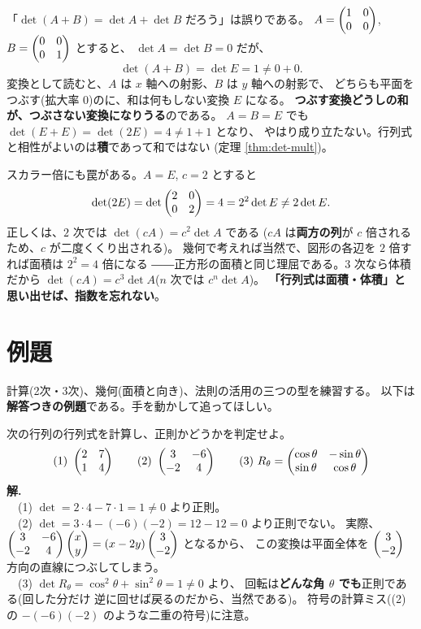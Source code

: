 \begin{hanrei}[行列式は和を保たない]\label{hanrei:detsum}
「$\det(A + B) = \det A + \det B$ だろう」は誤りである。
$A = \begin{pmatrix}1 & 0 \\ 0 & 0\end{pmatrix}$, $B = \begin{pmatrix}0 & 0 \\ 0 & 1\end{pmatrix}$ とすると、
$\det A = \det B = 0$ だが、
\[
\det(A + B) = \det E = 1 \neq 0 + 0.
\]
変換として読むと、$A$ は $x$ 軸への射影、$B$ は $y$ 軸への射影で、
どちらも平面をつぶす(拡大率 $0$)のに、和は何もしない変換 $E$ になる。
\textbf{つぶす変換どうしの和が、つぶさない変換になりうる}のである。
$A = B = E$ でも $\det(E + E) = \det(2E) = 4 \neq 1 + 1$ となり、
やはり成り立たない。行列式と相性がよいのは\textbf{積}であって和ではない
(定理 \ref{thm:det-mult})。
\end{hanrei}

\begin{hanrei}[$\det(cA) = c \det A$ は誤り]\label{hanrei:detscalar}
スカラー倍にも罠がある。$A = E$, $c = 2$ とすると
\[
\det(2E) = \det \begin{pmatrix}2 & 0 \\ 0 & 2\end{pmatrix} = 4 = 2^2 \det E \neq 2 \det E.
\]
正しくは、$2$ 次では $\det(cA) = c^2 \det A$ である
($cA$ は\textbf{両方の列}が $c$ 倍されるため、$c$ が二度くくり出される)。
幾何で考えれば当然で、図形の各辺を $2$ 倍すれば面積は $2^2 = 4$ 倍になる
――正方形の面積と同じ理屈である。$3$ 次なら体積だから
$\det(cA) = c^3 \det A$($n$ 次では $c^n \det A$)。
\textbf{「行列式は面積・体積」と思い出せば、指数を忘れない}。
\end{hanrei}

\section{例題}

計算(2次・3次)、幾何(面積と向き)、法則の活用の三つの型を練習する。
以下は\textbf{解答つきの例題}である。手を動かして追ってほしい。

\begin{rei}[例題・基本($2$ 次の計算と判定)]\label{rei:det-basic2}
次の行列の行列式を計算し、正則かどうかを判定せよ。
\[
(1)\ \begin{pmatrix}2 & 7 \\ 1 & 4\end{pmatrix} \qquad
(2)\ \begin{pmatrix}3 & -6 \\ -2 & 4\end{pmatrix} \qquad
(3)\ R_\theta = \begin{pmatrix}\cos\theta & -\sin\theta \\ \sin\theta & \cos\theta\end{pmatrix}
\]
\textbf{解.}\\
　(1) $\det = 2 \cdot 4 - 7 \cdot 1 = 1 \neq 0$ より正則。\\
　(2) $\det = 3 \cdot 4 - (-6)(-2) = 12 - 12 = 0$ より正則でない。
実際、$\begin{pmatrix}3 & -6 \\ -2 & 4\end{pmatrix}\begin{pmatrix}x \\ y\end{pmatrix} = (x - 2y)\begin{pmatrix}3 \\ -2\end{pmatrix}$ となるから、
この変換は平面全体を $\begin{pmatrix}3 \\ -2\end{pmatrix}$ 方向の直線につぶしてしまう。\\
　(3) $\det R_\theta = \cos^2\theta + \sin^2\theta = 1 \neq 0$ より、
回転は\textbf{どんな角 $\theta$ でも}正則である(回した分だけ
逆に回せば戻るのだから、当然である)。
符号の計算ミス((2) の $-(-6)(-2)$ のような二重の符号)に注意。
\end{rei}

